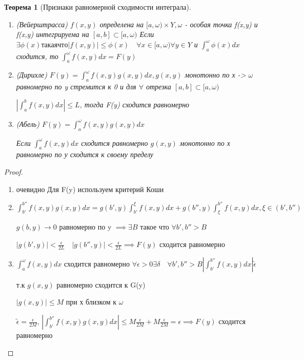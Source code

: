 \documentclass[a4paper, 12pt]{article}
\newtheorem{theorem}{Теорема}[section]
\theoremstyle{definition}
\theoremstyle{remark}
\begin{document}
\begin{theorem}[Признаки равномерной сходимости интеграла]
     \begin{enumerate}
          \item(Вейерштрасса) $f(x,y)$ определена на $[a, \omega)\times Y, \omega$ - особая точка f(x,y) и f(x,y) интегрируема на $[a,b]\subset[a, \omega)$
          Если $\exists \phi(x) такая что |f(x,y)| \leq\phi(x)\quad \forall x \in [a,\omega)\forall y\in Y$ и $\int_a^\omega \phi(x)dx$ сходится, то $\int_a^\omega f(x, y)dx = F(y)$
          \item(Дирихле) $F(y) = \int_a^\omega f(x, y)g(x,y)dx, g(x,y)$ монотонно по х -> $\omega$ равномерно по y стремится к 0
          и для $\forall$ отрезка $[a,b]\subset[a,\omega)$

          $|\int_a^b f(x, y)dx|\leq L$, тогда F(y) сходится равномерно
          \item (Абель) $F(y) = \int_a^\omega f(x, y)g(x,y)dx$
          
          Если $\int_a^\omega f(x, y)dx$ сходится равномерно $g(x,y)$ монотонно по х равномерно по у сходится к своему пределу 
     \end{enumerate}
\end{theorem}
\begin{proof}
     \begin{enumerate}
          \item очевидно
          Для F(y) используем критерий Коши
          \item $\int_{b'}^{b''}f(x,y)g(x,y)dx = g(b', y)\int_{b'}^\xi f(x,y)dx + g(b'', y)\int_{\xi}^{b''} f(x,y)dx, \xi \in (b', b'')$
          
          $g(b, y)\to 0$ равномерно по y $\implies\exists B$ такое что $\forall b', b'' > B$

          $|g(b', y)|< \frac{\epsilon}{2L}\quad |g(b'', y)|< \frac{\epsilon}{2L}\implies F(y)$ сходится равномерно
          \item $\int_a^\omega f(x,y)dx$ сходится равномерно
          $\forall \epsilon>0 \exists\delta \quad \forall b', b'' > B |\int_{b'}^{b''}f(x,y)dx| \widetilde{\epsilon}$

          т.к $g(x,y)$ равномерно сходится к G(y)

          $|g(x,y)|\leq M$ при х близком к $\omega$

          $\widetilde{\epsilon} = \frac{\epsilon}{2M}$, $|\int_{b'}^{b''}f(x,y)g(x,y)dx|\leq M\frac{\epsilon}{2M} +M\frac{\epsilon}{2M} = \epsilon\implies F(y)$ сходится равномерно
     \end{enumerate}
\end{proof}
\end{document}
